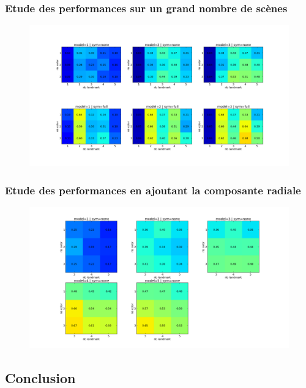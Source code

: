 \documentclass{beamer}
\newenvironment{changemargin}[2]{%
  \begin{list}{}{%
    \setlength{\topsep}{0pt}%
    \setlength{\leftmargin}{#1}%
    \setlength{\rightmargin}{#2}%
    \setlength{\listparindent}{\parindent}%
    \setlength{\itemindent}{\parindent}%
    \setlength{\parsep}{\parskip}%
  }%
  \item[]}{\end{list}}
\begin{document}
\begin{frame}
  \frametitle{Etude des performances sur un grand nombre de scènes}
  \begin{changemargin}{-1.0cm}{0cm}
  \begin{figure}
    \centering
    \includegraphics[scale=0.3]{res_sym.png}
  \end{figure}  
  \end{changemargin}
\end{frame}

\begin{frame}
  \frametitle{Etude des performances en ajoutant la composante radiale}
  \begin{changemargin}{-1.0cm}{0cm}
  \begin{figure}
    \centering
    \includegraphics[scale=0.3]{res_45.png}
  \end{figure}  
  \end{changemargin}
\end{frame}

\subsection{Conclusion}%
\end{document}
